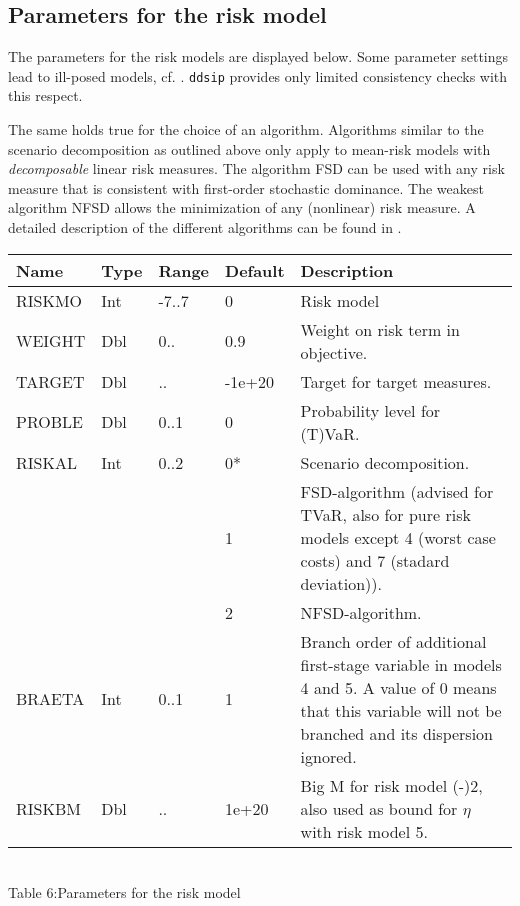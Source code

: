 \documentclass[11pt,draft]{article}
\newcommand{\+}{{\ti{+}}}
\newcommand{\1}{{\ti{1}}}
\begin{document}
\subsection{Parameters for the risk model}
The parameters for the risk models are displayed below. Some parameter settings lead to
ill-posed models, cf. \cite{diss}. \texttt{ddsip} provides only limited consistency checks with this
respect.  

The same holds true for the choice of an algorithm. Algorithms similar to the scenario decomposition
as outlined above only apply to mean-risk models with {\it decomposable} linear risk measures. The
algorithm FSD can be used with any risk measure that is consistent with first-order stochastic
dominance. The weakest algorithm NFSD allows the minimization of any (nonlinear) risk measure. A
detailed description of the different algorithms can be found in \cite{diss}. 
%
\begin{center}
\begin{tabular}{|llllp{5.9cm}|} 
\hline
Name&Type&Range&Default&Description\\ \hline
RISKMO&Int&-7..7&0&Risk model\medskip\\
WEIGHT&Dbl&0..&0.9&Weight on risk term in objective.\medskip\\
TARGET&Dbl&..&-1e+20&Target for target measures.\medskip\\
PROBLE&Dbl&0..1&0&Probability level for (T)VaR.\medskip\\
RISKAL&Int&0..2&0*&Scenario decomposition.\\
&&&1&FSD-algorithm (advised for TVaR, also for pure risk models except 4 (worst case costs) and 7 (stadard deviation)).\\
&&&2&NFSD-algorithm.\medskip\\
BRAETA&Int&0..1&1&Branch order of additional first-stage variable in models 4 and 5. A value of 0
means that this variable will not be branched
and its dispersion ignored.\medskip\\
RISKBM&Dbl&..&1e+20 &Big M for risk model (-)2, also used as bound for $\eta$ with risk model 5.\\
\hline
\end{tabular}
\\[0.5em]{Table 6:\quad Parameters for the risk model}
\end{center}%
\end{document}
